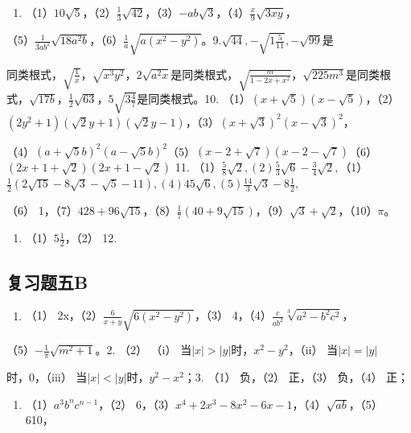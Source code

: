 \begin{enumerate}[start=8]
\item
  （1）\(10\sqrt{5}\)，（2）\(\frac{1}{3}\sqrt{42}\)，（3）\(-ab\sqrt{3}\)，（4）\(\frac{x}{9}\sqrt{3xy}\)，
\end{enumerate}

（5）\(\frac{1}{3ab^2}\sqrt{18a^2b}\)，（6）\(\frac{1}{a}\sqrt{a(x^2 - y^2)}\)。9.\(\sqrt{44}, -\sqrt{1\frac{5}{11}}, -\sqrt{99}\)是

同类根式，\(\sqrt{\frac{1}{x}}\)，\(\sqrt{x^{3}y^{2}}\)，\(2\sqrt{a^{2}x}\)是同类根式，\(\sqrt{\frac{m}{1-2x+x^{2}}}\)，\(\sqrt{225m^{3}}\)是同类根式，\(\sqrt{17b}\)，\(\frac{1}{2}\sqrt{63}\)，\(5\sqrt{3\frac{4}{7}}\)是同类根式。10.
（1）\((x+\sqrt{5})(x-\sqrt{5})\)，（2）\((2y^{2}+1)(\sqrt{2}y+1)(\sqrt{2}y-1)\)，（3）\((x+\sqrt{3})^{2}(x-\sqrt{3})^{2}\)，

（4）\((a + \sqrt{5} b)^2 (a - \sqrt{5} b)^2\)（5）\((x - 2 + \sqrt{7})(x - 2 - \sqrt{7})\)（6）\((2x + 1 + \sqrt{2})(2x + 1 - \sqrt{2})\)
11.
（1）\(\frac{5}{8}\sqrt{2}, (2)\frac{5}{3}\sqrt{6} - \frac{3}{4}\sqrt{2},\)（1）\(\frac{1}{2}(2\sqrt{15} - 8\sqrt{3} - \sqrt{5} - 11), (4) 45\sqrt{6}, (5)\frac{14}{3}\sqrt{3} - 8\frac{1}{2},\)

（6）
1，（7）\(428 + 96\sqrt{15}\)，（8）\(\frac{1}{7}(40 + 9\sqrt{15})\)，（9）\(\sqrt{3} + \sqrt{2}\)，（10）\(\pi\)。

\begin{enumerate}[start=12]
\item
  （1）\(5\frac{1}{2}\)，（2） 12.
\end{enumerate}

\subsection{复习题五B}

\begin{enumerate}
\item
  （1） 2x，（2）\(\frac{6}{x + y}\sqrt{6(x^2 - y^2)}\)，（3）
  4，（4）\(\frac{c}{ab^2}\sqrt[3]{a^2 - b^2c^2}\)，
\end{enumerate}

（5）\(-\frac{1}{\pi}\sqrt{m^2 + 1}\)。2. （2） （i）
当\(|x| > |y|\)时，\(x^2 - y^2\)，（ii） 当\(|x| = |y|\)

时，0，（iii） 当\(|x| < |y|\)时，\(y^2 - x^2\)；3. （1） 负，（2）
正，（3） 负，（4） 正；

\begin{enumerate}[start=5]
\item
  （1）\(a^3 b^n c^{n-1}\)，（2）
  6，（3）\(x^4 + 2x^3 - 8x^2 - 6x - 1\)，（4）\(\sqrt{ab}\)，（5）
  610，
\end{enumerate}

